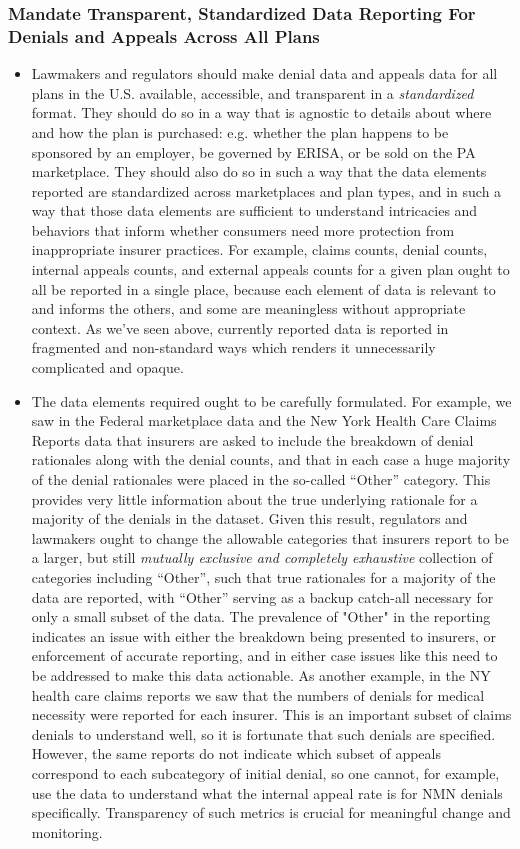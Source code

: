 \documentclass[12pt, a4paper,twoside]{report}
\theoremstyle{plain} %
\theoremstyle{definition} %
\theoremstyle{remark} %
\numberwithin{equation}{chapter}
\begin{document}
		\subsubsection{Mandate Transparent, Standardized Data Reporting For Denials and Appeals Across All Plans}
		
		\begin{itemize}
			\item Lawmakers and regulators should make denial data and appeals data for all plans in the U.S. available, accessible, and transparent in a \emph{standardized} format. They should do so in a way that is agnostic to details about where and how the plan is purchased: e.g. whether the plan happens to be sponsored by an employer, be governed by ERISA, or be sold on the PA marketplace. They should also do so in such a way that the data elements reported are standardized across marketplaces and plan types, and in such a way that those data elements are sufficient to understand intricacies and behaviors that inform whether consumers need more protection from inappropriate insurer practices. For example, claims counts, denial counts, internal appeals counts, and external appeals counts for a given plan ought to all be reported in a single place, because each element of data is relevant to and informs the others, and some are meaningless without appropriate context. As we've seen above, currently reported data is reported in fragmented and non-standard ways which renders it unnecessarily complicated and opaque.
			
			\item The data elements required ought to be carefully formulated. For example, we saw in the Federal marketplace data and the New York Health Care Claims Reports data that insurers are asked to include the breakdown of denial rationales along with the denial counts, and that in each case a huge majority of the denial rationales were placed in the so-called ``Other'' category. This provides very little information about the true underlying rationale for a majority of the denials in the dataset. Given this result, regulators and lawmakers ought to change the allowable categories that insurers report to be a larger, but still \emph{mutually exclusive and completely exhaustive} collection of categories including ``Other'', such that true rationales for a majority of the data are reported, with ``Other'' serving as a backup catch-all necessary for only a small subset of the data. The prevalence of "Other" in the reporting indicates an issue with either the breakdown being presented to insurers, or enforcement of accurate reporting, and in either case issues like this need to be addressed to make this data actionable. As another example, in the NY health care claims reports we saw that the numbers of denials for medical necessity were reported for each insurer. This is an important subset of claims denials to understand well, so it is fortunate that such denials are specified. However, the same reports do not indicate which subset of appeals correspond to each subcategory of initial denial, so one cannot, for example, use the data to understand what the internal appeal rate is for NMN denials specifically. Transparency of such metrics is crucial for meaningful change and monitoring.
			

\end{itemize}
\end{document}
